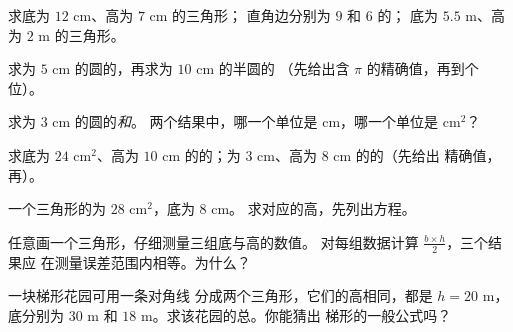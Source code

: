 \begin{exercise}[$\star$]\label{exo:g7:areas:3}
求底为 $12$ cm、高为 $7$ cm 的三角形；
直角边分别为 $9$ 和 $6$ 的；
底为 $5.5$ m、高为 $2$ m 的三角形。
\end{exercise}

\begin{exercise}[$\star$]\label{exo:g7:areas:4}
求为 $5$ cm 的圆的，再求为 $10$ cm 的半圆的
（先给出含 $\pi$ 的精确值，再到个位）。
\end{exercise}

\begin{exercise}[$\star$]\label{exo:g7:areas:5}
求为 $3$ cm 的圆的\emph{和}。
两个结果中，哪一个单位是 cm，哪一个单位是 cm$^2$？
\end{exercise}

\begin{exercise}[$\star$]\label{exo:g7:areas:6}
求底为 $24$ cm$^2$、高为
$10$ cm 的的；为 $3$ cm、高为 $8$ cm 的的（先给出
精确值，再）。
\end{exercise}

\begin{exercise}[$\star$]\label{exo:g7:areas:7}
一个三角形的为 $28$ cm$^2$，底为 $8$ cm。
求对应的高，先列出方程。
\end{exercise}

\begin{exercise}[$\star\star$]\label{exo:g7:areas:8}
任意画一个三角形，仔细测量三组底与高的数值。
对每组数据计算 $\frac{b \times h}{2}$，三个结果应
在测量误差范围内相等。为什么？
\end{exercise}

\begin{exercise}[$\star\star$]\label{exo:g7:areas:9}
一块梯形花园可用一条对角线
分成两个三角形，它们的高相同，都是 $h = 20$ m，底分别为 $30$ m 和
$18$ m。求该花园的总。你能猜出
梯形的一般公式吗？
\end{exercise}

